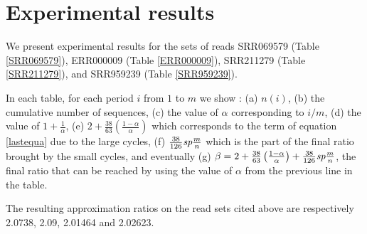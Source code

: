 \documentclass[10pt]{article}
\newcommand{\cn}{\textrm{\it sp}}
\newcommand{\be}{\beta}
\begin{document}
\section{Experimental results}
\label{exprest}

We present experimental results for the sets of reads SRR069579 (Table
\ref{SRR069579}), ERR000009 (Table \ref{ERR000009}), SRR211279 (Table
\ref{SRR211279}), and SRR959239 (Table \ref{SRR959239}). 

In each table, for each period $i$ from $1$ to $m$ we show : (a)
$n(i)$, (b) the cumulative number of sequences, (c) the value of
$\alpha$ corresponding to $i/m$, (d) the value of $1+\frac{1}{\alpha}$, (e) $2
+ \frac{38}{63} \left( \frac{1-\alpha}{\alpha} \right)$ which
corresponds to the term of equation \ref{lastequa} due to the large
cycles, (f) $\frac{38}{126} \cn \frac{m}{n}$ which is the part of the
final ratio brought by the small cycles, and eventually (g) $\be  = 2 + \frac{38}{63} \left( \frac{1-\alpha}{\alpha} \right) + \frac{38}{126} \cn \frac{m}{n}$, the final ratio that can be reached by using the value of $\alpha$ from the
previous line in the table.


The resulting approximation ratios on the read sets cited above are
respectively 2.0738, 2.09, 2.01464 and 2.02623.
\end{document}
